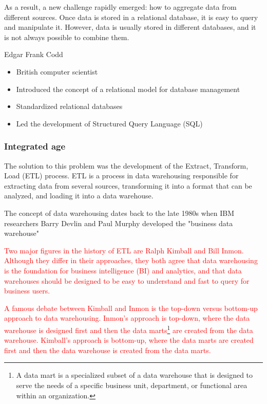 As a result, a new challenge rapidly emerged: how to aggregate data from different
sources. Once data is stored in a relational database, it is easy to query and manipulate
it. However, data is usually stored in different databases, and it is not always possible
to combine them.

\begin{slidebox}{Edgar Frank Codd}{}
  \begin{itemize}
    \item British computer scientist
    \item Introduced the concept of a relational model for database management
    \item Standardized relational databases
    \item Led the development of Structured Query Language (SQL)
  \end{itemize}
\end{slidebox}

\subsubsection{Integrated age}

The solution to this problem was the development of the Extract, Transform, Load (ETL)
process.  ETL is a process in data warehousing responsible for extracting data from
several sources, transforming it into a format that can be analyzed, and loading it into a
data warehouse.

The concept of data warehousing dates back to the late 1980s when IBM researchers Barry
Devlin and Paul Murphy developed the "business data warehouse"

\textcolor{red}{
Two major figures in the history of ETL are Ralph Kimball and Bill Inmon.  Although they
differ in their approaches, they both agree that data warehousing is the foundation for
business intelligence (BI) and analytics, and that data warehouses should be designed to
be easy to understand and fast to query for business users.
}

\textcolor{red}{
A famous debate between Kimball and Inmon is the top-down versus bottom-up approach to
data warehousing.  Inmon's approach is top-down, where the data warehouse is designed
first and then the data marts\footnote{A data mart is a specialized subset of a data warehouse that is designed to serve the needs of a specific business unit, department, or functional area within an organization.} are created from the data warehouse.  Kimball's approach is
bottom-up, where the data marts are created first and then the data warehouse is created
from the data marts.
}

